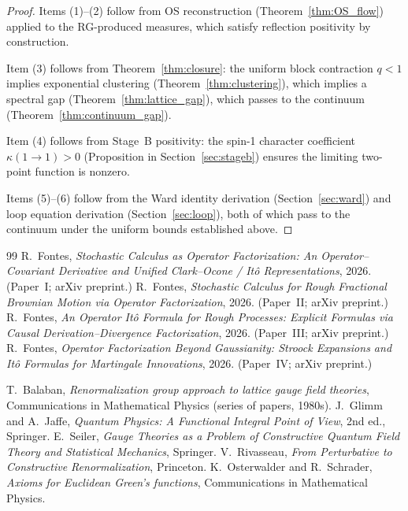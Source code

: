 \documentclass[11pt]{article}
\theoremstyle{definition}
\newcommand{\1}{\mathbf{1}}
\begin{document}
\begin{proof}
Items (1)--(2) follow from OS reconstruction (Theorem~\ref{thm:OS_flow}) applied to the RG-produced 
measures, which satisfy reflection positivity by construction.

Item (3) follows from Theorem~\ref{thm:closure}: the uniform block contraction $q < 1$ implies 
exponential clustering (Theorem~\ref{thm:clustering}), which implies a spectral gap 
(Theorem~\ref{thm:lattice_gap}), which passes to the continuum (Theorem~\ref{thm:continuum_gap}).

Item (4) follows from Stage~B positivity: the spin-1 character coefficient $\kappa(1 \to 1) > 0$ 
(Proposition in Section~\ref{sec:stageb}) ensures the limiting two-point function is nonzero.

Items (5)--(6) follow from the Ward identity derivation (Section~\ref{sec:ward}) and loop equation 
derivation (Section~\ref{sec:loop}), both of which pass to the continuum under the uniform bounds 
established above.
\end{proof}

\begin{thebibliography}{99}
 R.~Fontes, \emph{Stochastic Calculus as Operator Factorization: An Operator--Covariant Derivative and Unified Clark--Ocone / It\^o Representations}, 2026. (Paper~I; arXiv preprint.)
 R.~Fontes, \emph{Stochastic Calculus for Rough Fractional Brownian Motion via Operator Factorization}, 2026. (Paper~II; arXiv preprint.)
 R.~Fontes, \emph{An Operator It\^o Formula for Rough Processes: Explicit Formulas via Causal Derivation--Divergence Factorization}, 2026. (Paper~III; arXiv preprint.)
 R.~Fontes, \emph{Operator Factorization Beyond Gaussianity: Stroock Expansions and It\^o Formulas for Martingale Innovations}, 2026. (Paper~IV; arXiv preprint.)

 T.~Balaban, \emph{Renormalization group approach to lattice gauge field theories}, Communications in Mathematical Physics (series of papers, 1980s).
 J.~Glimm and A.~Jaffe, \emph{Quantum Physics: A Functional Integral Point of View}, 2nd ed., Springer.
 E.~Seiler, \emph{Gauge Theories as a Problem of Constructive Quantum Field Theory and Statistical Mechanics}, Springer.
 V.~Rivasseau, \emph{From Perturbative to Constructive Renormalization}, Princeton.
 K.~Osterwalder and R.~Schrader, \emph{Axioms for Euclidean Green's functions}, Communications in Mathematical Physics.
\end{thebibliography}
\end{document}
